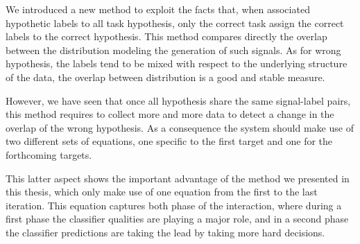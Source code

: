 We introduced a new method to exploit the facts that, when associated hypothetic labels to all task hypothesis, only the correct task assign the correct labels to the correct hypothesis. This method compares directly the overlap between the distribution modeling the generation of such signals. As for wrong hypothesis, the labels tend to be mixed with respect to the underlying structure of the data, the overlap between distribution is a good and stable measure. 

However, we have seen that once all hypothesis share the same signal-label pairs, this method requires to collect more and more data to detect a change in the overlap of the wrong hypothesis. As a consequence the system should make use of two different sets of equations, one specific to the first target and one for the forthcoming targets.

This latter aspect shows the important advantage of the method we presented in this thesis, which only make use of one equation from the first to the last iteration. This equation captures both phase of the interaction, where during a first phase the classifier qualities are playing a major role, and in a second phase the classifier predictions are taking the lead by taking more hard decisions.